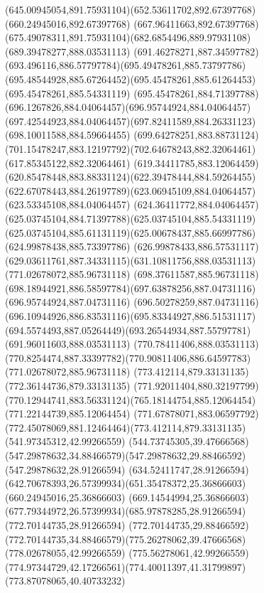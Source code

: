 {{		\curveto(645.00945054,891.75931104)(652.53611702,892.67397768)(660.24945016,892.67397768)
		\curveto(667.96411663,892.67397768)(675.49078311,891.75931104)(682.6854496,889.97931108)
		\moveto(689.39478277,888.03531113)
		\curveto(691.46278271,887.34597782)(693.496116,886.57797784)(695.49478261,885.73797786)
		\curveto(695.48544928,885.67264452)(695.45478261,885.61264453)(695.45478261,885.54331119)
		\curveto(695.45478261,884.71397788)(696.1267826,884.04064457)(696.95744924,884.04064457)
		\curveto(697.42544923,884.04064457)(697.82411589,884.26331123)(698.10011588,884.59664455)
		\curveto(699.64278251,883.88731124)(701.15478247,883.12197792)(702.64678243,882.32064461)
		\lineto(617.85345122,882.32064461)
		\curveto(619.34411785,883.12064459)(620.85478448,883.88331124)(622.39478444,884.59264455)
		\curveto(622.67078443,884.26197789)(623.06945109,884.04064457)(623.53345108,884.04064457)
		\curveto(624.36411772,884.04064457)(625.03745104,884.71397788)(625.03745104,885.54331119)
		\curveto(625.03745104,885.61131119)(625.00678437,885.66997786)(624.99878438,885.73397786)
		\curveto(626.99878433,886.57531117)(629.03611761,887.34331115)(631.10811756,888.03531113)
		\closepath
		\moveto(771.02678072,885.96731118)
		\lineto(698.37611587,885.96731118)
		\curveto(698.18944921,886.58597784)(697.63878256,887.04731116)(696.95744924,887.04731116)
		\curveto(696.50278259,887.04731116)(696.10944926,886.83531116)(695.83344927,886.51531117)
		\curveto(694.5574493,887.05264449)(693.26544934,887.55797781)(691.96011603,888.03531113)
		\lineto(770.78411406,888.03531113)
		\curveto(770.8254474,887.33397782)(770.90811406,886.64597783)(771.02678072,885.96731118)
		\moveto(773.412114,879.33131135)
		\lineto(772.36144736,879.33131135)
		\curveto(771.92011404,880.32197799)(770.12944741,883.56331124)(765.18144754,885.12064454)
		\lineto(771.22144739,885.12064454)
		\curveto(771.67878071,883.06597792)(772.45078069,881.12464464)(773.412114,879.33131135)
		\moveto(541.97345312,42.99266559)
		\curveto(544.73745305,39.47666568)(547.29878632,34.88466579)(547.29878632,29.88466592)
		\lineto(547.29878632,28.91266594)
		\lineto(634.52411747,28.91266594)
		\curveto(642.70678393,26.57399934)(651.35478372,25.36866603)(660.24945016,25.36866603)
		\curveto(669.14544994,25.36866603)(677.79344972,26.57399934)(685.97878285,28.91266594)
		\lineto(772.70144735,28.91266594)
		\lineto(772.70144735,29.88466592)
		\curveto(772.70144735,34.88466579)(775.26278062,39.47666568)(778.02678055,42.99266559)
		\lineto(775.56278061,42.99266559)
		\curveto(774.97344729,42.17266561)(774.40011397,41.31799897)(773.87078065,40.40733232)
}}
